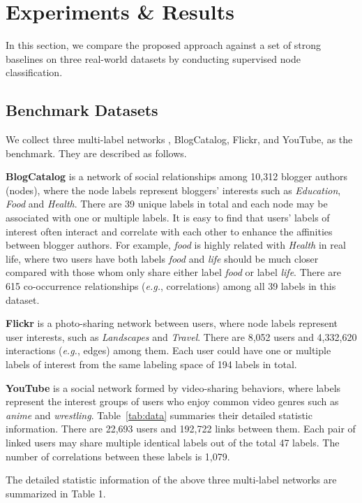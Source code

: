 \documentclass[conference]{IEEEtran}
\begin{document}
\section{Experiments \& Results}
In this section, we compare the proposed approach against a set of strong baselines on three real-world datasets by conducting supervised node classification.

\subsection{Benchmark Datasets}
We collect three multi-label networks \cite{12,21}, BlogCatalog, Flickr, and YouTube, as the benchmark. They are described as follows.

\textbf{BlogCatalog} is a network of social relationships among 10,312 blogger authors (nodes), where the node labels represent bloggers' interests such as \textit{Education}, \textit{Food} and \textit{Health}. There are 39 unique labels in total and each node may be associated with one or multiple labels. It is easy to find that users' labels of interest often interact and correlate with each other to enhance the affinities between blogger authors. For example, \textit{food} is highly related with \textit{Health} in real life, where two users have both labels \textit{food} and \textit{life} should be much closer compared with those whom only share either label \textit{food} or label \textit{life}. There are 615 co-occurrence relationships (\textit{e.g.}, correlations) among all 39 labels in this dataset.

\textbf{Flickr} is a photo-sharing network between users, where node labels represent user interests, such as \textit{Landscapes} and \textit{Travel}. There are 8,052 users and 4,332,620 interactions (\textit{e.g.}, edges) among them. Each user could have one or multiple labels of interest from the same labeling space of 194 labels in total. 

\textbf{YouTube} is a social network formed by video-sharing behaviors, where labels represent the interest groups of users who enjoy common video genres such as \textit{anime} and \textit{wrestling}. Table~\ref{tab:data} summaries their detailed statistic information. There are 22,693 users and 192,722 links between them. Each pair of linked users may share multiple identical labels out of the total 47 labels. The number of correlations between these labels is 1,079.

The detailed statistic information of the above three multi-label networks are summarized in Table 1.
\end{document}
